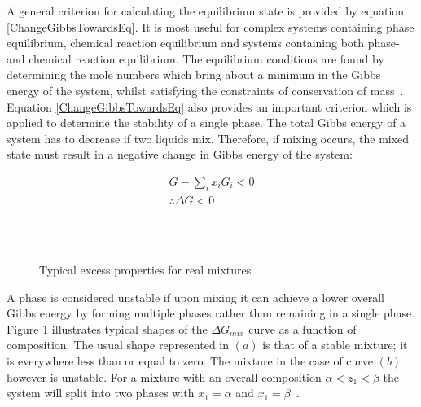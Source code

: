 A general criterion for calculating the equilibrium state is provided by equation \ref{ChangeGibbsTowardsEq}. It is most useful for complex systems containing phase equilibrium, chemical reaction equilibrium and systems containing both phase- and chemical reaction equilibrium. The equilibrium conditions are found by determining the mole numbers which bring about a minimum in the Gibbs energy of the system, whilst satisfying the constraints of conservation of mass~\cite{Dechema, SmithNessAbbott, GasLiquidProperties, SolidLiquidStability, LLECalculation, BilevelOptimization, StabilityAnalysis, ReliableComputationBinaryParams}.\\

Equation \ref{ChangeGibbsTowardsEq} also provides an important criterion which is applied to determine the stability of a single phase. The total Gibbs energy of a system has to decrease if two liquids mix. Therefore, if mixing occurs, the mixed state must result in a negative change in Gibbs energy of the system:\ 

\begin{eqnarray}
G - \sum_{i} x_{i}G_{i} < 0\\
\therefore \Delta G < 0
\end{eqnarray}\


\begin{figure}[t]
\begin{center}
\resizebox{0.7\textwidth}{!}{}\\
\end{center}
\caption{Typical excess properties for real mixtures} \label{GibsMixDrawing}
\end{figure}	

A phase is considered unstable if upon mixing it can achieve a lower overall Gibbs energy by forming multiple phases rather than remaining in a single phase. Figure \ref{GibsMixDrawing} illustrates typical shapes of the $\Delta G_{mix}$ curve as a function of composition. The usual shape represented in $\left(a\right)$ is that of a stable mixture; it is everywhere less than or equal to zero. The mixture in the case of curve $\left(b\right)$ however is unstable. For a mixture with an overall composition $\alpha < z_{1}< \beta$ the system will split into two phases with $x_{1} = \alpha$ and  $x_{1} = \beta $~\cite{ SmithNessAbbott, Dechema, SolidLiquidStability, BilevelOptimization, ReliableComputationBinaryParams, MultiphaseEquilibria}.\\

